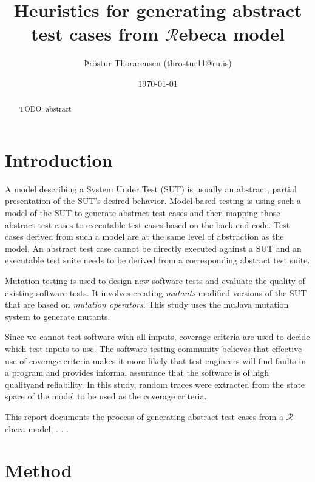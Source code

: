 \documentclass{article}
\begin{document}
\newcommand{\Rebeca}{$\mathcal{R}$ebeca\xspace}

\title{Heuristics for generating abstract test cases from \Rebeca model}
\author{Þröstur Thorarensen (throstur11@ru.is)}
\date{\today}
\maketitle

\begin{abstract}
	TODO: abstract
\end{abstract}

\section{Introduction}
	A model describing a System Under Test (SUT) is usually an abstract, partial presentation of the SUT's desired behavior. Model-based testing is using such a model of the SUT to generate abstract test cases and then mapping those abstract test cases to executable test cases based on the back-end code. Test cases derived from such a model are at the same level of abstraction as the model. An abstract test case cannot be directly executed against a SUT and an executable test suite needs to be derived from a corresponding abstract test suite.

	Mutation testing is used to design new software tests and evaluate the quality of existing software tests. It involves creating \textit{mutants} modified versions of the SUT that are based on \textit{mutation operators}. This study uses the muJava \citep{mujava} mutation system to generate mutants.


	Since we cannot test software with all imputs, coverage criteria are used to decide which test inputs to use. The software testing community believes that effective use of coverage criteria makes it more likely that test engineers will find faults in a program and provides informal assurance that the software is of high qualityand reliability. In this study, random traces were extracted from the state space of the model to be used as the coverage criteria.


	This report documents the process of generating abstract test cases from a \Rebeca model, . . . %


\section{Method}
\end{document}
